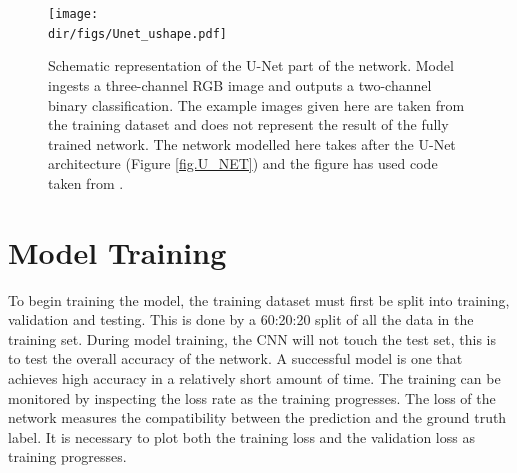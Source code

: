 \begin{figure}[htpb]
    \centering
    \texttt{[image: \\dir/figs/Unet\_ushape.pdf]}
    \caption[Schematic representation of the U-Net part of the network]{Schematic representation of the U-Net part of the network. Model ingests a three-channel RGB image and outputs a two-channel binary classification. The example images given here are taken from the training dataset and does not represent the result of the fully trained network. The network modelled here takes after the U-Net architecture (Figure \ref{fig.U_NET}) and the figure has used code taken from \citet{iqbal18}.}
    \label{fig.unet_large}
\end{figure}


\section{Model Training}\label{sec.model_training}
To begin training the model, the training dataset must first be split into training, validation and testing. This is done by a 60:20:20 split of all the data in the training set. During model training, the CNN will not touch the test set, this is to test the overall accuracy of the network. A successful model is one that achieves high accuracy in a relatively short amount of time. The training can be monitored by inspecting the loss rate as the training progresses. The loss of the network measures the compatibility between the prediction and the ground truth label. It is necessary to plot both the training loss and the validation loss as training progresses.  


